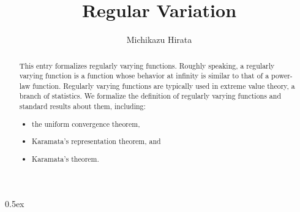 \documentclass[11pt,a4paper]{article}
\begin{document}
\title{Regular Variation}
\author{Michikazu Hirata}
\maketitle
\begin{abstract}
  This entry formalizes regularly varying functions.
  Roughly speaking,
  a regularly varying function is
  a function
  whose behavior at infinity is similar to that of a power-law function.
  Regularly varying functions are typically used in
  extreme value theory, a branch of statistics.
  We formalize the definition of regularly varying functions
  and standard results about them, including:
  \begin{itemize}
  \item the uniform convergence theorem,
  \item Karamata's representation theorem, and
  \item Karamata's theorem.
  \end{itemize}
\end{abstract}

\tableofcontents

\parindent 0pt\parskip 0.5ex





\end{document}
